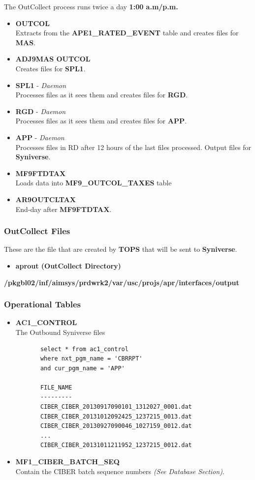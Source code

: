 \documentclass[12pt,twoside]{article}
\begin{document}
   The OutCollect process runs twice a day \textbf{1:00 a.m/p.m.}
\begin{itemize}
\item \textbf{OUTCOL} \\ Extracts from the \textbf{APE1\_RATED\_EVENT} table and creates files for \textbf{MAS}.
\item \textbf{ADJ9MAS OUTCOL}\\ Creates files for \textbf{SPL1}.
\item \textbf{SPL1} - \emph{Daemon}\\ Processes files as it sees them and creates files for \textbf{RGD}.
\item \textbf{RGD} - \emph{Daemon}\\ Processes files as it sees them and creates files for \textbf{APP}.
\item \textbf{APP} - \emph{Daemon}\\ Processes files in RD after 12 hours of the last files processed. Output files for \textbf{Syniverse}.
\item \textbf{MF9FTDTAX}\\ Loads data into \textbf{MF9\_OUTCOL\_TAXES} table
\item \textbf{AR9OUTCLTAX}\\ End-day after \textbf{MF9FTDTAX}.
\end{itemize}
\subsubsection{OutCollect Files}
\label{sec-3-6-1}

   These are the file that are created by \textbf{TOPS} that will be sent to \textbf{Syniverse}.
\begin{itemize}
\item \textbf{aprout (OutCollect Directory)} \\
\end{itemize}
   \textbf{\//pkgbl02\//inf\//aimsys\//prdwrk2\//var\//usc\//projs\//apr\//interfaces\//output}
\subsubsection{Operational Tables}
\label{sec-3-6-2}
\begin{itemize}

\item \textbf{AC1\_CONTROL}\\
\label{sec-3-6-2-1}%
The Outbound Syniverse files
\begin{verbatim}
       select * from ac1_control
       where nxt_pgm_name = 'CBRRPT'
       and cur_pgm_name = 'APP'
      
       FILE_NAME
       ---------
       CIBER_CIBER_20130917090101_1312027_0001.dat
       CIBER_CIBER_20131012092425_1237215_0013.dat
       CIBER_CIBER_20130927090046_1027159_0012.dat
       ...
       CIBER_CIBER_20131011211952_1237215_0012.dat
\end{verbatim}

\item \textbf{MF1\_CIBER\_BATCH\_SEQ}\\
\label{sec-3-6-2-2}%
Contain the CIBER batch sequence numbers \emph{(See Database Section)}.
\end{itemize} %
\end{document}
